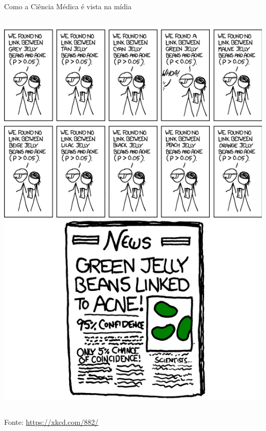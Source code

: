 \documentclass{beamer}
\begin{document}
\begin{frame}{\scriptsize Como a Ciência Médica é vista na mídia}
\begin{columns}
\begin{column}{5cm}
\begin{center}
        \includegraphics[height=.8\textheight]{Cap10-11/xkcd-significant2}
      \end{center}
    \end{column}
  \end{columns}
  \vfill
  \begin{center}
    \scriptsize
    Fonte: \url{https://xkcd.com/882/}
  \end{center}
\end{frame}
\end{document}
